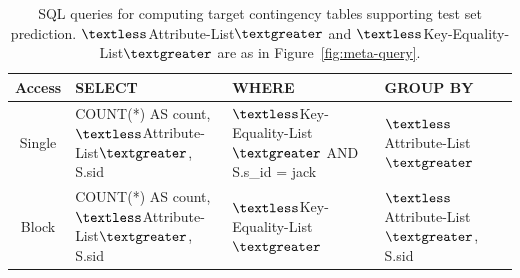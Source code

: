 \begin{table}[t]
\caption{SQL queries for computing target contingency tables supporting test set prediction.  $\textless$Attribute-List$\textgreater$ and  $\textless$Key-Equality-List$\textgreater$ are as in Figure~\ref{fig:meta-query}.}
\begin{center}
\begin{tabular}{|c|p{6cm}|p{5cm}|p{4cm}|}
\hline
Access &SELECT&WHERE&GROUP BY\\\hline
Single &COUNT(*) AS count, $\textless$Attribute-List$\textgreater$, S.sid& $\textless$Key-Equality-List$\textgreater$ AND S.s\_id = jack&  $\textless$Attribute-List$\textgreater$\\
\hline
Block & COUNT(*) AS count,  $\textless$Attribute-List$\textgreater$, S.sid& $\textless$Key-Equality-List$\textgreater$ &  $\textless$Attribute-List$\textgreater$, S.sid\\\hline
\end{tabular}
\end{center}
\label{table:target-query}
\end{table}%






